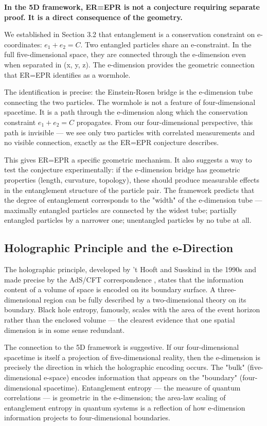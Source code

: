 \documentclass[aps,prd,preprint,superscriptaddress,longbibliography,floatfix]{revtex4-2}
\theoremstyle{remark}
\begin{document}
\textbf{In the 5D framework, ER=EPR is not a conjecture requiring separate proof. It is a direct consequence of the geometry.}

We established in Section 3.2 that entanglement is a conservation constraint on e-coordinates: $e_{1} + e_{2} = C$. Two entangled particles share an e-constraint. In the full five-dimensional space, they are connected through the e-dimension even when separated in (x, y, z). The e-dimension provides the geometric connection that ER=EPR identifies as a wormhole.

The identification is precise: the Einstein-Rosen bridge is the e-dimension tube connecting the two particles. The wormhole is not a feature of four-dimensional spacetime. It is a path through the e-dimension along which the conservation constraint $e_{1} + e_{2} = C$ propagates. From our four-dimensional perspective, this path is invisible --- we see only two particles with correlated measurements and no visible connection, exactly as the ER=EPR conjecture describes.

This gives ER=EPR a specific geometric mechanism. It also suggests a way to test the conjecture experimentally: if the e-dimension bridge has geometric properties (length, curvature, topology), these should produce measurable effects in the entanglement structure of the particle pair. The framework predicts that the degree of entanglement corresponds to the "width" of the e-dimension tube --- maximally entangled particles are connected by the widest tube; partially entangled particles by a narrower one; unentangled particles by no tube at all.



\subsection{Holographic Principle and the e-Direction}

The holographic principle, developed by 't Hooft and Susskind in the 1990s and made precise by the AdS/CFT correspondence \cite{Maldacena1997}, states that the information content of a volume of space is encoded on its boundary surface. A three-dimensional region can be fully described by a two-dimensional theory on its boundary. Black hole entropy, famously, scales with the area of the event horizon rather than the enclosed volume --- the clearest evidence that one spatial dimension is in some sense redundant.

The connection to the 5D framework is suggestive. If our four-dimensional spacetime is itself a projection of five-dimensional reality, then the e-dimension is precisely the direction in which the holographic encoding occurs. The "bulk" (five-dimensional e-space) encodes information that appears on the "boundary" (four-dimensional spacetime). Entanglement entropy --- the measure of quantum correlations --- is geometric in the e-dimension; the area-law scaling of entanglement entropy in quantum systems is a reflection of how e-dimension information projects to four-dimensional boundaries.
\end{document}

